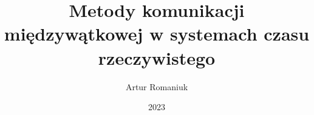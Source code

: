 \documentclass[thesis=inz,faculty=ee]{EE-dyplom}
\title{Metody komunikacji międzywątkowej w systemach czasu rzeczywistego}
\author{Artur Romaniuk}
\date{2023}
\begin{document}
\frontpages



\bibliografia


\acronymslist
\listoffigures
\listoftables
\easyappendices
\end{document}
